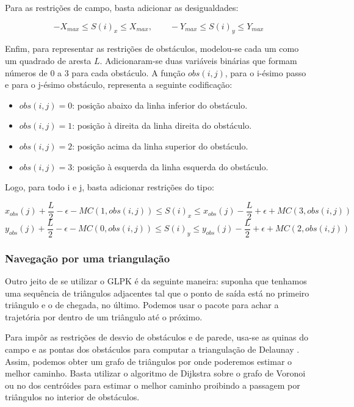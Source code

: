 \documentclass[a4paper,12pt]{article}
\begin{document}
Para as restrições de campo, basta adicionar as desigualdades:

\begin{equation}
	-X_{max} \leqslant S(i)_{x} \leqslant X_{max}, \qquad -Y_{max} \leqslant S(i)_{y} \leqslant Y_{max}
\end{equation}

Enfim, para representar as restrições de obstáculos, modelou-se cada um como um quadrado de aresta $L$. Adicionaram-se duas variáveis binárias que formam números de 0 a 3 para cada obstáculo. A função $obs(i, j)$, para o i-ésimo passo e para o j-ésimo obstáculo, representa a seguinte codificação:

\begin{itemize}
\item $obs(i, j) = 0$: posição abaixo da linha inferior do obstáculo.
\item $obs(i, j) = 1$: posição à direita da linha direita do obstáculo.
\item $obs(i, j) = 2$: posição acima da linha superior do obstáculo.
\item $obs(i, j) = 3$: posição à esquerda da linha esquerda do obstáculo.
\end{itemize}

Logo, para todo i e j, basta adicionar restrições do tipo:

\begin{equation}
	x_{obs}(j) +  \frac{L}{2} - \epsilon - MC(1,obs(i,j)) \leq S(i)_x \leq x_{obs}(j) - \frac{L}{2} + \epsilon + MC(3,obs(i,j))
\end{equation}
\begin{equation}
	y_{obs}(j) +  \frac{L}{2} - \epsilon - MC(0,obs(i,j)) \leq S(i)_y \leq y_{obs}(j) -  \frac{L}{2} + \epsilon  + MC(2,obs(i,j))
\end{equation}

\subsubsection{Navegação por uma triangulação}

Outro jeito de se utilizar o GLPK é da seguinte maneira: suponha que tenhamos uma sequência de triângulos adjacentes tal que o ponto de saída está no primeiro triângulo e o de chegada, no último. Podemos usar o pacote para achar a trajetória por dentro de um triângulo até o próximo.

Para impôr as restrições de desvio de obstáculos e de parede, usa-se as quinas do campo e as pontas dos obstáculos para computar a triangulação de Delaunay \cite{delaunay34}. Assim, podemos obter um grafo de triângulos por onde poderemos estimar o melhor caminho. Basta utilizar o algoritmo de Dijkstra \cite{dijkstra59} sobre o grafo de Voronoi \cite{voronoi08} ou no dos centróides para estimar o melhor caminho proibindo a passagem por triângulos no interior de obstáculos.
\end{document}
